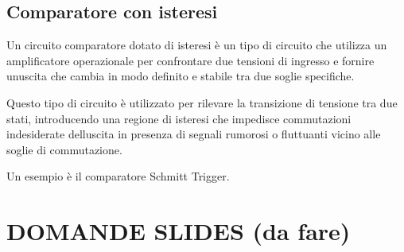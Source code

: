 \documentclass[
]{article}
\begin{document}
{}

{}

{}

{}

{}

\subsection{\texorpdfstring{{Comparatore con
isteresi}}{Comparatore con isteresi}}\label{h.caqcz1f70il2}

{Un circuito comparatore dotato di isteresi è un tipo di circuito che
utilizza un amplificatore operazionale per confrontare due tensioni di
ingresso e fornire un\textquotesingle uscita che cambia in modo definito
e stabile tra due soglie specifiche.}

{}

{Questo tipo di circuito è utilizzato per rilevare la transizione di
tensione tra due stati, introducendo una regione di isteresi che
impedisce commutazioni indesiderate dell\textquotesingle uscita in
presenza di segnali rumorosi o fluttuanti vicino alle soglie di
commutazione.}

{}

{Un esempio è il comparatore Schmitt Trigger.}

{}

{}

{}

{}

{}

{}

{}

\section{\texorpdfstring{{DOMANDE SLIDES (da
fare)}}{DOMANDE SLIDES (da fare)}}\label{h.2fdulleeuzgg}

{}
\end{document}
